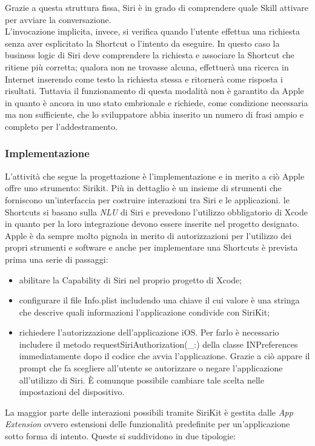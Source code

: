 		Grazie a questa struttura fissa, Siri è in grado di comprendere quale Skill attivare per avviare la conversazione. \\
		L'invocazione implicita, invece, si verifica quando l'utente effettua una richiesta senza aver esplicitato la Shortcut o l'intento da eseguire. In questo caso la business logic di Siri deve comprendere la richiesta e associare la Shortcut che ritiene più corretta; qualora non ne trovasse alcuna, effettuerà una ricerca in Internet inserendo come testo la richiesta stessa e ritornerà come risposta i risultati. Tuttavia il funzionamento di questa modalità non è garantito da Apple in quanto è ancora in uno stato embrionale e richiede, come condizione necessaria ma non sufficiente, che lo sviluppatore abbia inserito un numero di frasi ampio e completo per l'addestramento.
		\subsubsection{Implementazione}
		L'attività che segue la progettazione è l'implementazione e in merito a ciò Apple offre uno strumento: Sirikit. Più in dettaglio è un insieme di strumenti che forniscono un'interfaccia per costruire interazioni tra Siri e le applicazioni. le Shortcuts si basano sulla \textit{NLU} di Siri e prevedono l'utilizzo obbligatorio di Xcode in quanto per la loro integrazione devono essere inserite nel progetto designato. \\
		Apple è da sempre molto pignola in merito di autorizzazioni per l'utilizzo dei propri strumenti e software e anche per implementare una Shortcuts è prevista prima una serie di passaggi:
		\begin{itemize}
			\item abilitare la Capability di Siri nel proprio progetto di Xcode;
			\item configurare il file Info.plist includendo una chiave il cui valore è una stringa che descrive quali informazioni l'applicazione condivide con SiriKit;
			\item richiedere l’autorizzazione dell’applicazione iOS. Per farlo è necessario includere il metodo requestSiriAuthorization(_:) della classe INPreferences immediatamente dopo il codice che avvia l’applicazione. Grazie a ciò appare il prompt che fa scegliere all’utente se autorizzare o negare l’applicazione all’utilizzo di Siri. È comunque possibile cambiare tale scelta nelle impostazioni del dispositivo.
		\end{itemize}
		La maggior parte delle interazioni possibili tramite SiriKit è gestita dalle \textit{App Extension} ovvero estensioni delle funzionalità predefinite per un'applicazione sotto forma di intento. Queste si suddividono in due tipologie:
